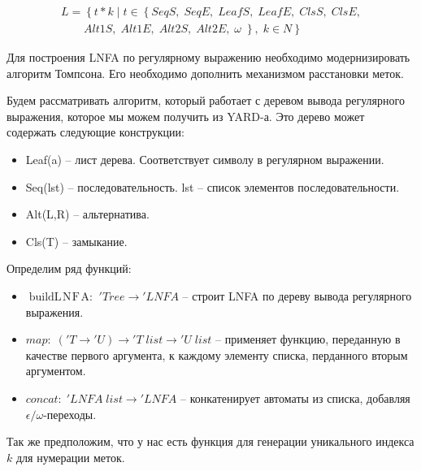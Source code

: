 \begin{eqnarray}
     \label{def:L}
	   &L = \left\{ \right. t*k\; | \; t \in \left\{ \right.  SeqS,\; SeqE,\; LeafS,\; LeafE,\; ClsS,\; ClsE, & \nonumber \\
	   & \qquad Alt1S,\; Alt1E,\; Alt2S,\; Alt2E,\; \omega \; \left. \right\},\; k \in N \left.\right\} &
\end{eqnarray}

Для построения LNFA по регулярному выражению необходимо модернизировать алгоритм Томпсона. Его необходимо дополнить механизмом расстановки меток.

Будем рассматривать алгоритм, который работает с деревом вывода регулярного выражения, которое мы можем получить из YARD-а. Это дерево может содержать следующие конструкции:
\begin{itemize}
  \item Leaf(a) -- лист дерева. Соответствует символу в регулярном выражении.
  \item Seq(lst) -- последовательность. lst -- список элементов последовательности.
  \item Alt(L,R) -- альтернатива.
  \item Cls(T) -- замыкание.
\end{itemize}

Определим ряд функций:
\begin{itemize}
  \item $\mathop{buildL\!N\!F\!A:} \; 'Tree \rightarrow {'L\!N\!F\!A}$ -- строит LNFA по дереву вывода регулярного выражения.

  \item $map: \; ('T \rightarrow {'U}) \rightarrow {'T}  \; list \rightarrow {'U} \; list$ -- применяет функцию, переданную в качестве первого аргумента, к каждому элементу списка, перданного вторым аргументом.

  \item $concat: \; 'L\!N\!F\!A \; list \rightarrow {'L\!N\!F\!A}$ -- конкатенирует автоматы из списка, добавляя $\epsilon/\omega$-переходы.  
\end{itemize}

Так же предположим, что у нас есть функция для генерации уникального индекса $k$ для нумерации меток.

